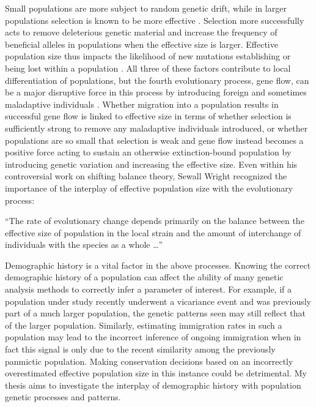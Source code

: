 





Small populations are more subject to random genetic drift, while in larger populations selection is known to be more effective \citep{Gravel:2016}. Selection more successfully acts to remove deleterious genetic material and increase the frequency of beneficial alleles in populations when the effective size is larger. Effective population size thus impacts the likelihood of new mutations establishing or being lost within a population \citep{Kimura:1962, Whitlock:2000}. All three of these factors contribute to local differentiation of populations, but the fourth evolutionary process, gene flow, can be a major disruptive force in this process by introducing foreign and sometimes maladaptive individuals \citep{Slatkin:1987}. Whether migration into a population results in successful gene flow is linked to effective size in terms of whether selection is sufficiently strong to remove any maladaptive individuals introduced, or whether populations are so small that selection is weak and gene flow instead becomes a positive force acting to sustain an otherwise extinction-bound population by introducing genetic variation and increasing the effective size. Even within his controversial work on shifting balance theory, Sewall Wright recognized the importance of the interplay of effective population size with the evolutionary process: %
\begin{quoteshrink}
  ``The rate of evolutionary change depends primarily on the balance between the effective size of population in the local strain and the amount of interchange of individuals with the species as a whole \dots''
  \hfill\citet{Wright:1930}
\end{quoteshrink}

Demographic history is a vital factor in the above processes. Knowing the correct demographic history of a population can affect the ability of many genetic analysis methods to correctly infer a parameter of interest. For example, if a population under study recently underwent a vicariance event and was previously part of a much larger population, the genetic patterns seen may still reflect that of the larger population. Similarly, estimating immigration rates in such a population may lead to the incorrect inference of ongoing immigration when in fact this signal is only due to the recent similarity among the previously panmictic population. Making conservation decisions based on an incorrectly overestimated effective population size in this instance could be detrimental. My thesis aims to investigate the interplay of demographic history with population genetic processes and patterns.

